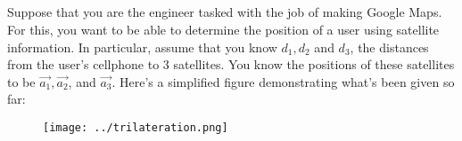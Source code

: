 \\ \\
\\ \\
Suppose that you are the engineer tasked with the job of making Google Maps. For this, you want to be able to determine the position of a user using satellite information. In particular, assume that you know $d_1, d_2$ and $d_3$, the distances from the user's cellphone to 3 satellites. You know the positions of these satellites to be $\vec{a_1}, \vec{a_2}$, and $\vec{a_3}$. Here's a simplified figure demonstrating what's been given so far:
\begin{figure}[H]
    \centering
    \texttt{[image: ../trilateration.png]}
\end{figure}

